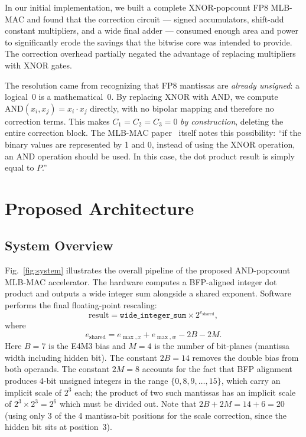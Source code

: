 \documentclass[conference]{IEEEtran}
\begin{document}
In our initial implementation, we built a complete XNOR-popcount
FP8 MLB-MAC and found that the correction circuit --- signed
accumulators, shift-add constant multipliers, and a wide final
adder --- consumed enough area and power to significantly erode the
savings that the bitwise core was intended to provide.  The
correction overhead partially negated the advantage of replacing
multipliers with XNOR gates.

The resolution came from recognizing that FP8 mantissas are
\emph{already unsigned}: a logical~0 is a mathematical~0.  By
replacing XNOR with AND, we compute
$\text{AND}(x_i, x_j) = x_i \cdot x_j$ directly, with no bipolar
mapping and therefore no correction terms.  This makes
$C_1 = C_2 = C_3 = 0$ \emph{by construction}, deleting the entire
correction block.  The MLB-MAC paper~\cite{b1} itself notes this
possibility: ``if the binary values are represented by 1 and 0,
instead of using the XNOR operation, an AND operation should be used.
In this case, the dot product result is simply equal to $P$.''

\section{Proposed Architecture}

\subsection{System Overview}
\label{ssec:system}

Fig.~\ref{fig:system} illustrates the overall pipeline of the
proposed AND-popcount MLB-MAC accelerator.  The hardware computes a
BFP-aligned integer dot product and outputs a wide integer sum
alongside a shared exponent.  Software performs the final
floating-point rescaling:
\begin{equation}
    \text{result} = \texttt{wide\_integer\_sum} \times
    2^{e_{\text{shared}}},
    \label{eq:sw_rescale}
\end{equation}
where
\begin{equation}
    e_{\text{shared}} = e_{\max,x} + e_{\max,w} - 2B - 2M.
    \label{eq:shared_exp}
\end{equation}
Here $B = 7$ is the E4M3 bias and $M = 4$ is the number of
bit-planes (mantissa width including hidden bit).  The constant
$2B = 14$ removes the double bias from both operands.  The constant
$2M = 8$ accounts for the fact that BFP alignment produces 4-bit
unsigned integers in the range $\{0, 8, 9, \ldots, 15\}$, which
carry an implicit scale of $2^3$ each; the product of two such
mantissas has an implicit scale of $2^{3} \times 2^{3} = 2^{6}$
which must be divided out.  Note that $2B + 2M = 14 + 6 = 20$
(using only 3 of the 4 mantissa-bit positions for the scale
correction, since the hidden bit sits at position~3).
\end{document}
